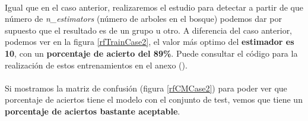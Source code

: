 \paragraph{}
Igual que en el caso anterior, realizaremos el estudio para detectar a partir de que número de \textit{n\_estimators}\cite{ref:rf_random_forest_classifier} (número de arboles en el bosque) podemos dar por supuesto que el resultado es de un grupo u otro. A diferencia del caso anterior, podemos ver en la figura \ref{rfTrainCase2}, el valor más optimo del \textbf{estimador es 10}, con un \textbf{porcentaje de acierto del 89\%}. Puede consultar el código para la realización de estos entrenamientos en el anexo ().

\paragraph{}
Si mostramos la matriz de confusión\cite{ref:confusion_matrix} (figura \ref{rfCMCase2}) para poder ver que porcentaje de aciertos tiene el modelo con el conjunto de test, vemos que tiene un \textbf{porcentaje de aciertos bastante aceptable}.

